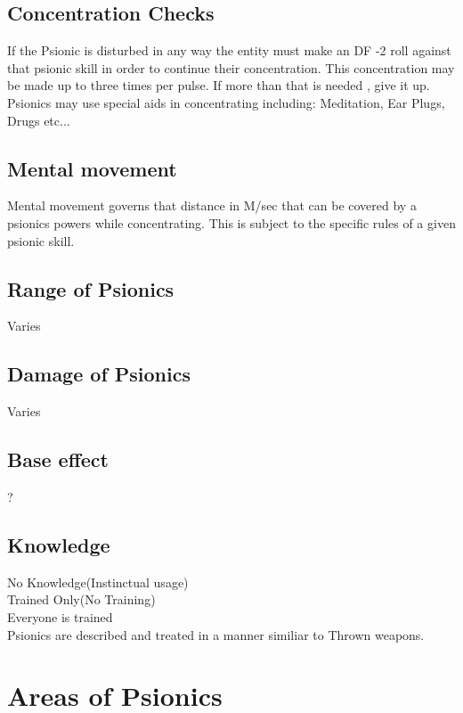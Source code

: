 \subsection{Concentration Checks}

If the Psionic is disturbed in any way the entity must make an DF -2 roll
against that psionic skill in order to continue their concentration. This
concentration may be made up to three times per pulse. If more than that is
needed , give it up. Psionics may use special aids in concentrating including: 
Meditation, Ear Plugs, Drugs etc...

\subsection{Mental movement}

Mental movement governs that distance in M/sec that can be covered by 
a psionics powers while concentrating. This is subject to the specific
rules of a given psionic skill.

\subsection{Range of Psionics}

Varies

\subsection{Damage of Psionics}

Varies

\subsection{Base effect}

?

\subsection{Knowledge}

No Knowledge(Instinctual usage) \\
Trained Only(No Training) \\
Everyone is trained \\

Psionics are described and treated in a manner similiar to Thrown weapons.

\section{Areas of Psionics}

